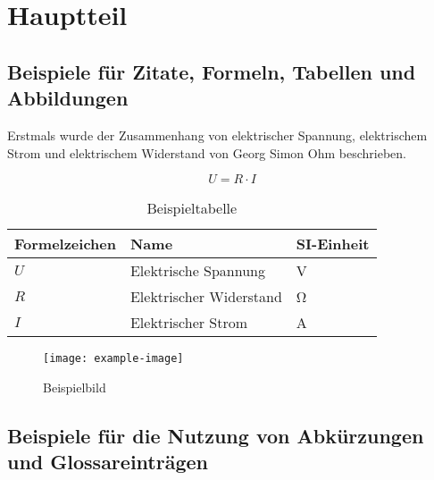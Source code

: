 \section{Hauptteil}
\label{sec:Hauptteil}

\subsection{Beispiele für Zitate, Formeln, Tabellen und Abbildungen}

Erstmals wurde der Zusammenhang von elektrischer Spannung, elektrischem Strom und elektrischem Widerstand von Georg Simon Ohm beschrieben. \cite{Ohm.1827}

\begin{equation}
    U = R \cdot I
\end{equation}

\begin{table}[htbp]
    \centering
    \caption{Beispieltabelle}
    \label{tab:bsp-tabelle}
    \begin{tabular}{lll}
        \toprule
        \textbf{Formelzeichen} & \textbf{Name} & \textbf{SI-Einheit} \\
        \midrule
        $U$ & Elektrische Spannung & \si{\volt} \\
        $R$ & Elektrischer Widerstand & \si{\ohm} \\
        $I$ & Elektrischer Strom & \si{\ampere} \\
        \bottomrule
    \end{tabular}
\end{table}

\begin{figure}[htbp]
    \centering
    \texttt{[image: example-image]} %
    \caption{Beispielbild}
    \label{fig:bsp-bild}
\end{figure}

\subsection{Beispiele für die Nutzung von Abkürzungen und Glossareinträgen}

